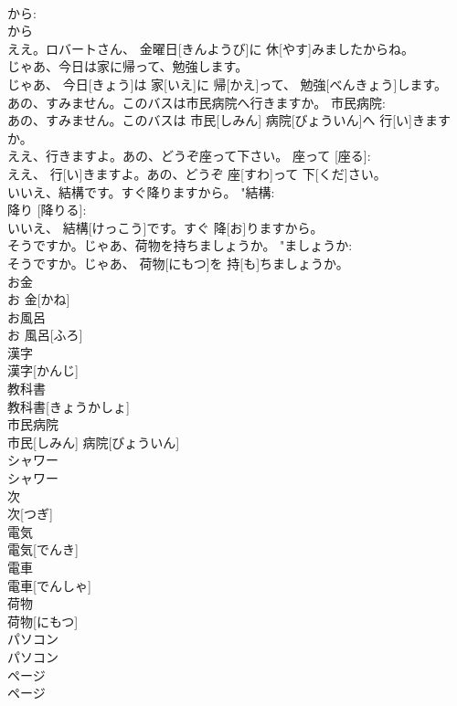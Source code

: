 \documentclass[8pt]{extreport}
\begin{document}
\begin{CJK}{UTF8}{min}
\\	から: 
\\	から 
\\	ええ。ロバートさん、 金曜日[きんようび]に 休[やす]みましたからね。		
\\	じゃあ、今日は家に帰って、勉強します。	
\\	じゃあ、 今日[きょう]は 家[いえ]に 帰[かえ]って、 勉強[べんきょう]します。	
\\	あの、すみません。このバスは市民病院へ行きますか。	市民病院: 
\\	あの、すみません。このバスは 市民[しみん] 病院[びょういん]へ 行[い]きますか。		
\\	ええ、行きますよ。あの、どうぞ座って下さい。	座って [座る]: 
\\	ええ、 行[い]きますよ。あの、どうぞ 座[すわ]って 下[くだ]さい。		
\\	いいえ、結構です。すぐ降りますから。	"結構: 
\\	降り [降りる]: 
\\	いいえ、 結構[けっこう]です。すぐ 降[お]りますから。		
\\	そうですか。じゃあ、荷物を持ちましょうか。	"ましょうか: 
\\	そうですか。じゃあ、 荷物[にもつ]を 持[も]ちましょうか。		
\\	お金	
\\	お 金[かね]		
\\	お風呂	
\\	お 風呂[ふろ]		
\\	漢字	
\\	漢字[かんじ]		
\\	教科書	
\\	教科書[きょうかしょ]		
\\	市民病院	
\\	市民[しみん] 病院[びょういん]		
\\	シャワー	
\\	シャワー		
\\	次	
\\	次[つぎ]		
\\	電気	
\\	電気[でんき]		
\\	電車	
\\	電車[でんしゃ]		
\\	荷物	
\\	荷物[にもつ]		
\\	パソコン	
\\	パソコン		
\\	ページ	
\\	ページ		

\end{CJK}
\end{document}
